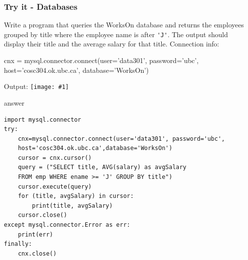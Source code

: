 \documentclass[xcolor=svgnames, handout]{beamer}
\newcommand{\ipic}[2]{\texttt{[image: \#1]}}
\newcommand{\ft}[1]{\frametitle{#1}}
\begin{document}
\begin{frame}[fragile]\ft{Try it - Databases}
\begin{example}
 Write a program that queries the {\sf WorksOn} database and returns the employees grouped by title where the employee name is after \verb|'J'|.  The output should display their title and the average salary for that title. Connection info:
 \begin{spverbatim}
cnx = mysql.connector.connect(user='data301', password='ubc', host='cosc304.ok.ubc.ca', database='WorksOn')
 \end{spverbatim}
Output: \ipic{Database}{0.3}
\end{example}
\end{frame}


%


\begin{frame}[fragile]
\begin{block}{answer}
\begin{Verbatim}[xleftmargin=-0.1in, fontsize=\small] 
import mysql.connector
try:
    cnx=mysql.connector.connect(user='data301', password='ubc',
    host='cosc304.ok.ubc.ca',database='WorksOn')
    cursor = cnx.cursor()
    query = ("SELECT title, AVG(salary) as avgSalary 
    FROM emp WHERE ename >= 'J' GROUP BY title")
    cursor.execute(query)
    for (title, avgSalary) in cursor:
        print(title, avgSalary)
    cursor.close()
except mysql.connector.Error as err:
    print(err)
finally:
    cnx.close()
\end{Verbatim}
\end{block}
\end{frame}
\end{document}

